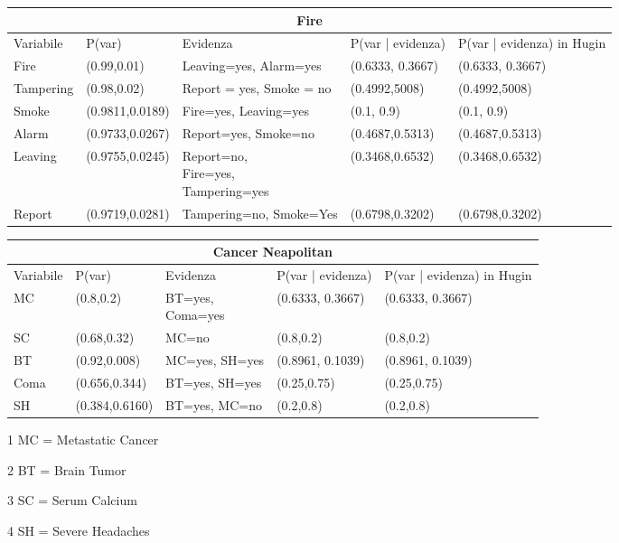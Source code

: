 \documentclass{report}
\begin{document}
\begin{table}[hbt!]
\small

\hskip-1.0cm\begin{tabular}{ |p{2cm}|p{2cm}|p{2cm}|p{3cm}|p{3cm}|  }
\hline
 \multicolumn{5}{|c|}{Fire} \\
 \hline
Variabile & P(var) & Evidenza & P(var | evidenza) & P(var | evidenza)  in Hugin\\
 \hline
Fire &(0.99,0.01) & Leaving=yes, Alarm=yes & (0.6333, 0.3667) &(0.6333, 0.3667)\\
\hline
Tampering & (0.98,0.02) & Report = yes, Smoke = no & (0.4992,5008)&  (0.4992,5008)\\
\hline
Smoke & (0.9811,0.0189) & Fire=yes, Leaving=yes & (0.1, 0.9) & (0.1, 0.9)\\
\hline
Alarm & (0.9733,0.0267) & Report=yes, Smoke=no & (0.4687,0.5313) & (0.4687,0.5313)\\
\hline
Leaving & (0.9755,0.0245) & \makecell[l]{Report=no, \\ Fire=yes, \\Tampering=yes} & (0.3468,0.6532) & (0.3468,0.6532)\\
\hline
Report & (0.9719,0.0281)&Tampering=no, Smoke=Yes & (0.6798,0.3202) & (0.6798,0.3202)\\
\hline
\end{tabular}
\newline
\vspace*{0.5 cm}
\newline

\hskip-1.0cm\begin{threeparttable}
\begin{tabular}{ |p{2cm}|p{2cm}|p{2cm}|p{3cm}|p{3cm}|  }
\hline
 \multicolumn{5}{|c|}{Cancer Neapolitan} \\
 \hline
Variabile & P(var) & Evidenza & P(var | evidenza) & P(var | evidenza)  in Hugin\\
 \hline
MC &(0.8,0.2) & \makecell[l]{BT=yes, \\Coma=yes} & (0.6333, 0.3667) &(0.6333, 0.3667)\\
\hline
SC & (0.68,0.32) & MC=no & (0.8,0.2)&  (0.8,0.2)\\
\hline
BT & (0.92,0.008) & MC=yes, SH=yes & (0.8961, 0.1039) & (0.8961, 0.1039)\\
\hline
Coma & (0.656,0.344) & BT=yes, SH=yes & (0.25,0.75) & (0.25,0.75)\\
\hline
SH & (0.384,0.6160) & BT=yes, MC=no & (0.2,0.8) &(0.2,0.8)\\
\hline
\end{tabular}
\begin{tablenotes}
 	    \item[1] MC = Metastatic Cancer
        \item[2] BT = Brain Tumor
        \item[3] SC = Serum Calcium
        \item[4] SH = Severe Headaches
 \end{tablenotes}
\end{threeparttable}
\end{table}
\end{document}
